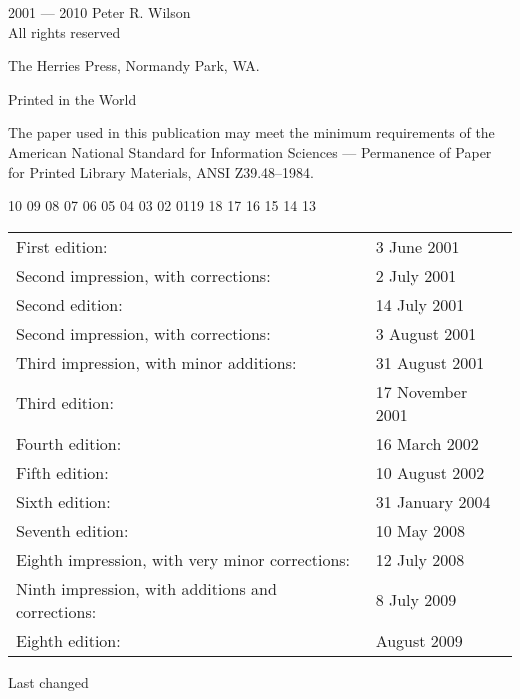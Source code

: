 \documentclass[10pt,letterpaper,extrafontsizes]{memoir}
\newcommand{\PWnote}[2]{}
\begin{document}
\PWnote{2009/06/26}{Updated the copyright page for 9th impression}
\begingroup
\footnotesize
\setlength{\parindent}{0pt}
\setlength{\parskip}{\baselineskip}
\textcopyright{} 2001 --- 2010 Peter R. Wilson \\
All rights reserved

The Herries Press, Normandy Park, WA.

Printed in the World 

The paper used in this publication may meet the minimum requirements
of the American National Standard for Information 
Sciences --- Permanence of Paper for Printed Library Materials, 
ANSI Z39.48--1984.

\PWnote{2009/07/08}{Changed manual date to 8 July 2009}
\begin{center}
10 09 08 07 06 05 04 03 02 01\hspace{2em}19 18 17 16 15 14 13
\end{center}
\begin{center}
\begin{tabular}{ll}
First edition:                        & 3 June 2001 \\
Second impression, with corrections:    & 2 July 2001 \\
Second edition:                       & 14 July 2001 \\
Second impression, with corrections:    & 3 August 2001 \\
Third impression, with minor additions: & 31 August 2001 \\
Third edition:                        & 17 November 2001 \\
Fourth edition:                       & 16 March 2002 \\
Fifth edition:                        & 10 August 2002 \\
Sixth edition:                        & 31 January 2004 \\
Seventh edition:                       & 10 May 2008 \\
Eighth impression, with very minor corrections: & 12 July 2008 \\
Ninth impression, with additions and corrections: & 8 July 2009 \\
Eighth edition:                        & August 2009 \\
\end{tabular}
\end{center}
Last changed \svnInfoDate
\end{document}
